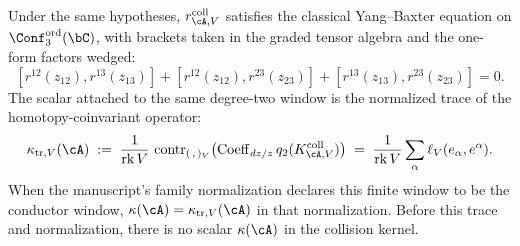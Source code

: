 \begin{proposition}
Under the same hypotheses, $r^{\mathrm{coll}}_{\cA,V}$ satisfies the
classical Yang--Baxter equation on
$\Conf^{\mathrm{ord}}_3(\bC)$, with brackets taken in the graded tensor
algebra and the one-form factors wedged:
\begin{equation}\label{eq:current-window-cybe}
[r^{12}(z_{12}),r^{13}(z_{13})]
+[r^{12}(z_{12}),r^{23}(z_{23})]
+[r^{13}(z_{13}),r^{23}(z_{23})]
=0 .
\end{equation}
The scalar attached to the same degree-two window is the normalized
trace of the homotopy-coinvariant operator:
\begin{equation}\label{eq:kappa-degree-two-trace}
\kappa_{\mathrm{tr},V}(\cA)
\;:=\;
\frac{1}{\operatorname{rk}V}\,
\operatorname{contr}_{(\,,\,)_V}
\!\left(\operatorname{Coeff}_{dz/z}
q_2(K^{\mathrm{coll}}_{\cA,V})\right)
\;=\;
\frac{1}{\operatorname{rk}V}
\sum_\alpha \ell_V(e_\alpha,e^\alpha).
\end{equation}
When the manuscript's family normalization declares this finite window
to be the conductor window, $\kappa(\cA)=\kappa_{\mathrm{tr},V}(\cA)$
in that normalization. Before this trace and normalization, there is no
scalar $\kappa(\cA)$ in the collision kernel.
\end{proposition}

